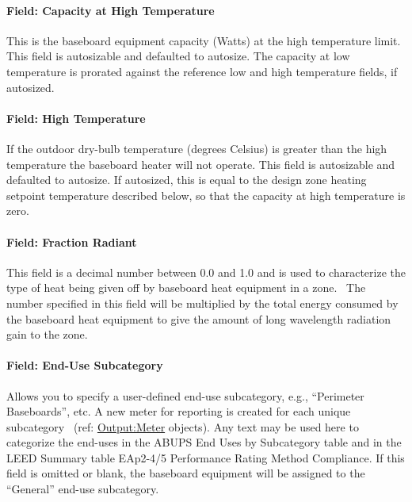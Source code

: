 \paragraph{Field: Capacity at High Temperature}\label{field-capacity-at-high-temperature}

This is the baseboard equipment capacity (Watts) at the high temperature limit. This field is autosizable and defaulted to autosize. The capacity at low temperature is prorated against the reference low and high temperature fields, if autosized.

\paragraph{Field: High Temperature}\label{field-high-temperature}

If the outdoor dry-bulb temperature (degrees Celsius) is greater than the high temperature the baseboard heater will not operate. This field is autosizable and defaulted to autosize. If autosized, this is equal to the design zone heating setpoint temperature described below, so that the capacity at high temperature is zero.

\paragraph{Field: Fraction Radiant}\label{field-fraction-radiant-7}

This field is a decimal number between 0.0 and 1.0 and is used to characterize the type of heat being given off by baseboard heat equipment in a zone.~ The number specified in this field will be multiplied by the total energy consumed by the baseboard heat equipment to give the amount of long wavelength radiation gain to the zone.

\paragraph{Field: End-Use Subcategory}\label{field-end-use-subcategory-5}

Allows you to specify a user-defined end-use subcategory, e.g., ``Perimeter Baseboards'', etc. A new meter for reporting is created for each unique subcategory~ (ref: \hyperref[outputmeter-and-outputmetermeterfileonly]{Output:Meter} objects). Any text may be used here to categorize the end-uses in the ABUPS End Uses by Subcategory table and in the LEED Summary table EAp2-4/5 Performance Rating Method Compliance. If this field is omitted or blank, the baseboard equipment will be assigned to the ``General'' end-use subcategory.

